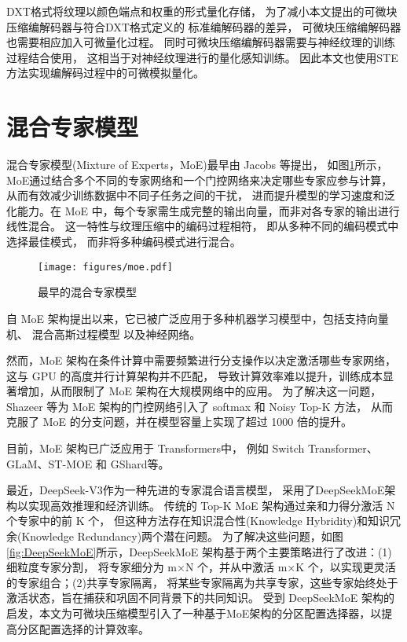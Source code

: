 DXT格式将纹理以颜色端点和权重的形式量化存储，
为了减小本文提出的可微块压缩编解码器与符合DXT格式定义的
标准编解码器的差异，
可微块压缩编解码器也需要相应加入可微量化过程。
同时可微块压缩编解码器需要与神经纹理的训练过程结合使用，
这相当于对神经纹理进行的量化感知训练。
因此本文也使用STE方法实现编解码过程中的可微模拟量化。


\section{混合专家模型}

混合专家模型(Mixture of Experts，MoE)最早由 Jacobs 等\cite{jacobs1991adaptive}提出，
如图\ref{fig:MoE}所示，MoE通过结合多个不同的专家网络和一个门控网络来决定哪些专家应参与计算，从而有效减少训练数据中不同子任务之间的干扰，
进而提升模型的学习速度和泛化能力。在 MoE 中，每个专家需生成完整的输出向量，而非对各专家的输出进行线性混合。
这一特性与纹理压缩中的编码过程相符，
即从多种不同的编码模式中选择最佳模式，
而非将多种编码模式进行混合。

\begin{figure}[htbp]
    \centering
    \texttt{[image: figures/moe.pdf]}
    \caption{最早的混合专家模型\cite{jacobs1991adaptive}}
    \label{fig:MoE}
\end{figure}

自 MoE 架构提出以来，它已被广泛应用于多种机器学习模型中，包括支持向量机\cite{collobert2002parallel}、
混合高斯过程模型\cite{tresp2001mixtures,rasmussen2001infinite}
以及神经网络\cite{aljundi2017expert,garmash2016ensemble,eigen2013learning}。

然而，MoE 架构在条件计算中需要频繁进行分支操作以决定激活哪些专家网络，这与 GPU 的高度并行计算架构并不匹配，
导致计算效率难以提升，训练成本显著增加，从而限制了 MoE 架构在大规模网络中的应用。
为了解决这一问题，Shazeer 等\cite{shazeer2017outrageously}为 MoE 架构的门控网络引入了 softmax 和 Noisy Top-K 方法，
从而克服了 MoE 的分支问题，并在模型容量上实现了超过 1000 倍的提升。

目前，MoE 架构已广泛应用于 Transformers\cite{vaswani2017attention}中，
例如 Switch Transformer\cite{fedus2022switch}、
GLaM\cite{du2022glam}、ST-MOE\cite{zoph2022st}
和 GShard\cite{lepikhin2020gshard}等。


最近，DeepSeek-V3\cite{liu2024deepseek}作为一种先进的专家混合语言模型，
采用了DeepSeekMoE架构\cite{dai2024deepseekmoe}以实现高效推理和经济训练。
传统的 Top-K MoE 架构通过亲和力得分激活 N 个专家中的前 K 个，
但这种方法存在知识混合性(Knowledge Hybridity)和知识冗余(Knowledge Redundancy)两个潜在问题。
为了解决这些问题，如图\ref{fig:DeepSeekMoE}所示，DeepSeekMoE 架构基于两个主要策略进行了改进：(1)细粒度专家分割，
将专家细分为 m×N 个，并从中激活 m×K 个，以实现更灵活的专家组合；(2)共享专家隔离，
将某些专家隔离为共享专家，这些专家始终处于激活状态，旨在捕获和巩固不同背景下的共同知识。
受到 DeepSeekMoE 架构的启发，本文为可微块压缩模型引入了一种基于MoE架构的分区配置选择器，以提高分区配置选择的计算效率。

